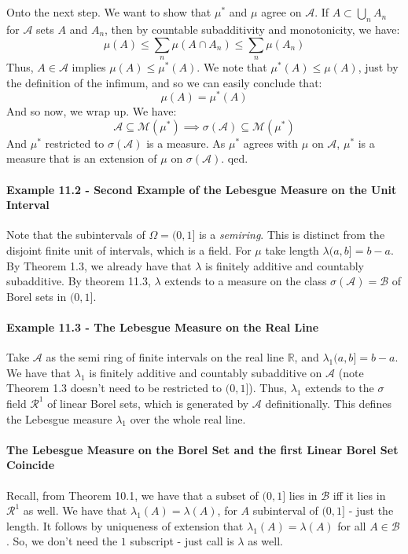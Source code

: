 \documentclass[12pt,a4paper]{article}
\newcommand{\1}[1]{\mathbbm{1}\left\{ #1 \right\}}
\newcommand{\R}{\mathbb{R}}
\newcommand{\acal}{\mathcal{A}}
\newcommand{\bcal}{\mathcal{B}}
\newcommand{\rcal}{\mathcal{R}}
\newcommand{\mcal}{\mathcal{M}}
\begin{document}
\\\\
Onto the next step. We want to show that $\mu^*$ and $\mu$ agree on $\acal$. If $A \subset \bigcup_n A_n$ for $\acal$ sets $A$ and $A_n$, then by countable subadditivity and monotonicity, we have:
$$
	\mu(A) \leq \sum_n \mu(A \cap A_n) \leq \sum_n \mu(A_n)
$$
Thus, $A \in \acal$ implies $\mu(A) \leq \mu^*(A)$. We note that $\mu^*(A) \leq \mu(A)$, just by the definition of the infimum, and so we can easily conclude that:
$$
	\mu(A) = \mu^*(A)
$$
And so now, we wrap up. We have:
$$
	\acal \subseteq \mcal(\mu^*) \implies
	\sigma(\acal) \subseteq \mcal(\mu^*)
$$
And $\mu^*$ restricted to $\sigma(\acal)$ is a measure. As $\mu^*$ agrees with $\mu$ on $\acal$, $\mu^*$ is a measure that is an extension of $\mu$ on $\sigma(\acal)$. qed.

\paragraph{Example 11.2 - Second Example of the Lebesgue Measure on the Unit Interval} Note that the subintervals of $\Omega = (0,1]$ is a \textit{semiring}. This is distinct from the disjoint finite unit of intervals, which is a field. For $\mu$ take length $\lambda(a,b] = b - a$. By Theorem 1.3, we already have that $\lambda$ is finitely additive and countably subadditive. By theorem 11.3, $\lambda$ extends to a measure on the class $\sigma(\acal) = \bcal$ of Borel sets in $(0,1]$. 

\paragraph{Example 11.3 - The Lebesgue Measure on the Real Line} Take $\acal$ as the semi ring of finite intervals on the real line $\R$, and $\lambda_1(a,b] = b - a$. We have that $\lambda_1$ is finitely additive and countably subadditive on $\acal$ (note Theorem 1.3 doesn't need to be restricted to $(0,1]$). Thus, $\lambda_1$ extends to the $\sigma$ field $\rcal^1$ of linear Borel sets, which is generated by $\acal$ definitionally. This defines the Lebesgue measure $\lambda_1$ over the whole real line.

\paragraph{The Lebesgue Measure on the Borel Set and the first Linear Borel Set Coincide} Recall, from Theorem 10.1, we have that a subset of $(0,1]$ lies in $\bcal$ iff it lies in $\rcal^1$ as well. We have that $\lambda_1(A) = \lambda(A)$, for $A$ subinterval of $(0,1]$ - just the length. It follows by uniqueness of extension that $\lambda_1(A) = \lambda(A)$ for all $A \in \bcal$. So, we don't need the $1$ subscript - just call is $\lambda$ as well.
\end{document}
